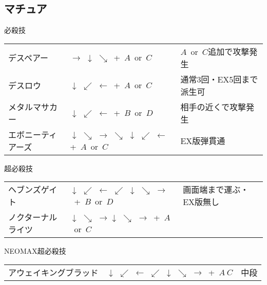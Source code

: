\documentclass[a4j,11pt]{jarticle}
\def\hado{$\downarrow$ $\searrow$ $\rightarrow$}%
\def\tatsu{$\downarrow$ $\swarrow$ $\leftarrow$}%
\def\syoryu{$\rightarrow$ $\downarrow$ $\searrow$}%
\def\ryuko{$\downarrow$ $\searrow$ $\rightarrow$ $\searrow$ $\downarrow$ $\swarrow$ $\leftarrow$}%
\def\orochi{$\downarrow$ $\swarrow$ $\leftarrow$ $\swarrow$ $\downarrow$ $\searrow$ $\rightarrow$}%
\begin{document}
\subsection{マチュア}
\begin{itembox}[l]{必殺技}
\begin{tabular}{lll}
デスペアー&\syoryu\ +\ $A$\ or\ $C$&$A$\ or\ $C$追加で攻撃発生\\%
デスロウ&\tatsu\ +\ $A$\ or\ $C$&通常3回・EX5回まで派生可\\%
メタルマサカー&\tatsu\ +\ $B$\ or\ $D$&相手の近くで攻撃発生\\%
エボニーティアーズ&\ryuko +\ $A$\ or\ $C$&EX版弾貫通%
\end{tabular}
\end{itembox}
\begin{itembox}[l]{超必殺技}
\begin{tabular}{lll}
ヘブンズゲイト&\orochi\ +\ $B$\ or\ $D$&画面端まで運ぶ・EX版無し\\ %
ノクターナルライツ&\hado\hado\ +\ $A$\ or\ $C$&%
\end{tabular}
\end{itembox}
\begin{itembox}[l]{NEOMAX超必殺技}
\begin{tabular}{lll}
アウェイキングブラッド&\orochi\ +\ $A\ C$&中段%
\end{tabular}
\end{itembox}
\newpage
\end{document}

